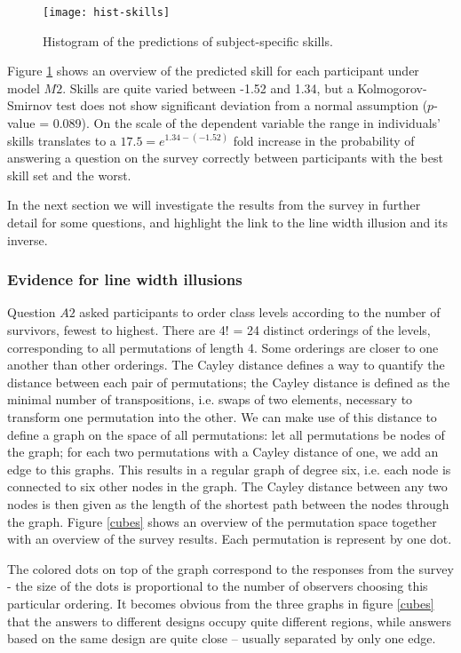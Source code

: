 \begin{figure}
\centering \texttt{[image: hist-skills]}
\caption{\label{skills}Histogram of the predictions of subject-specific skills. }
\end{figure}	
Figure \ref{skills} shows an overview of the predicted skill for each participant under model $M2$. Skills are quite varied between  -1.52 and  1.34, but
a Kolmogorov-Smirnov test  does not show significant deviation from a normal assumption ($p$-value = 0.089).
On the scale of the dependent variable the range in individuals' skills translates to a $17.5 = e^{1.34 - (-1.52)}$ fold increase in the probability of answering a question on the survey correctly between participants with the best skill set and the worst.

In the next section we will investigate the results from the survey in further detail for some questions, and highlight the link to the line width illusion and its inverse.

\subsubsection{Evidence for line width illusions}

Question $A2$ asked participants to order  class levels  according to the number of survivors, fewest to highest. There are 4! = 24 distinct orderings of the levels, corresponding to all permutations of length 4. Some orderings are closer to one another than other orderings. The Cayley distance defines a way to quantify the distance between  each pair of permutations; the Cayley distance is defined as the minimal number of transpositions, i.e. swaps of two elements,  necessary to transform one permutation into the other.
We can make use of this distance to define a graph on the space of all permutations: let all permutations be nodes of the graph; for each two permutations with a Cayley distance of one, we add an edge to this graphs. This results in a regular graph of degree six, i.e. each  node is connected to six other nodes in the graph. The Cayley distance between any two nodes is then given as the length of the shortest path between the nodes through the graph.
Figure \ref{cubes} shows an overview of the permutation space together with an overview of the survey results. Each permutation is represent by one dot. 

The colored dots on top of the graph correspond to the responses from the survey - the size of the dots is proportional to the number of observers choosing this particular ordering. It becomes obvious from the three graphs in figure \ref{cubes} that
the answers to different designs occupy quite different regions, while answers based  on the same design are quite close --  usually separated by only one edge. 


